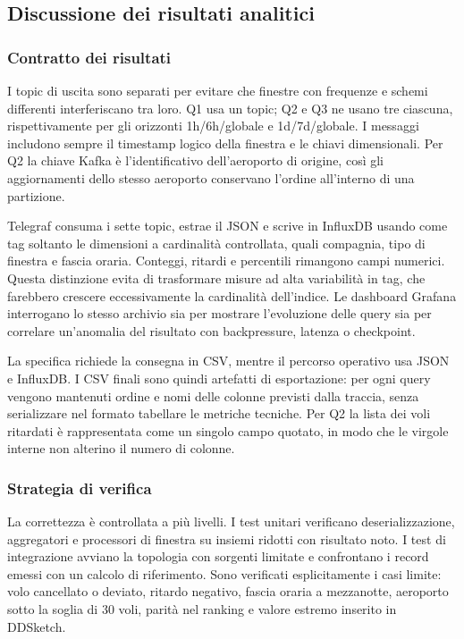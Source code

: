 \documentclass[conference]{IEEEtran}
\begin{document}
\subsection{Discussione dei risultati analitici}\label{sec:validation}
\subsubsection{Contratto dei risultati}
I topic di uscita sono separati per evitare che finestre con frequenze e schemi differenti interferiscano tra loro. Q1 usa un topic; Q2 e Q3 ne usano tre ciascuna, rispettivamente per gli orizzonti 1h/6h/globale e 1d/7d/globale. I messaggi includono sempre il timestamp logico della finestra e le chiavi dimensionali. Per Q2 la chiave Kafka è l'identificativo dell'aeroporto di origine, così gli aggiornamenti dello stesso aeroporto conservano l'ordine all'interno di una partizione.

Telegraf consuma i sette topic, estrae il JSON e scrive in InfluxDB usando come tag soltanto le dimensioni a cardinalità controllata, quali compagnia, tipo di finestra e fascia oraria. Conteggi, ritardi e percentili rimangono campi numerici. Questa distinzione evita di trasformare misure ad alta variabilità in tag, che farebbero crescere eccessivamente la cardinalità dell'indice. Le dashboard Grafana interrogano lo stesso archivio sia per mostrare l'evoluzione delle query sia per correlare un'anomalia del risultato con backpressure, latenza o checkpoint.

La specifica richiede la consegna in CSV, mentre il percorso operativo usa JSON e InfluxDB. I CSV finali sono quindi artefatti di esportazione: per ogni query vengono mantenuti ordine e nomi delle colonne previsti dalla traccia, senza serializzare nel formato tabellare le metriche tecniche. Per Q2 la lista dei voli ritardati è rappresentata come un singolo campo quotato, in modo che le virgole interne non alterino il numero di colonne.

\subsubsection{Strategia di verifica}
La correttezza è controllata a più livelli. I test unitari verificano deserializzazione, aggregatori e processori di finestra su insiemi ridotti con risultato noto. I test di integrazione avviano la topologia con sorgenti limitate e confrontano i record emessi con un calcolo di riferimento. Sono verificati esplicitamente i casi limite: volo cancellato o deviato, ritardo negativo, fascia oraria a mezzanotte, aeroporto sotto la soglia di 30 voli, parità nel ranking e valore estremo inserito in DDSketch.
\end{document}
